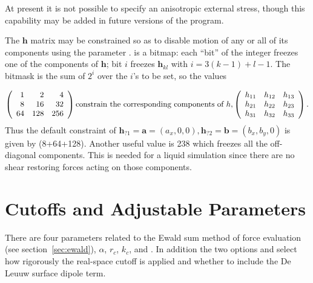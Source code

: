 \documentclass[a4paper,twoside]{report}
\providecommand{\bm}[1]{\mathbf{#1}}
\begin{document}
At present it is not possible to specify an anisotropic external
stress, though this capability may be added in future versions of the
program.

\label{sec:cp-constraints}
The $\bm{h}$ matrix may be constrained so as to disable motion of any
or all of its components using the parameter . 
 is a bitmap: each ``bit'' of the integer
freezes one of the components of $\bm{h}$;
bit $i$ freezes $ \bm{h}_{kl}$ with 
$ i = 3 (k\!-\!1)\! +\! l\! -\!1$.
The bitmask is the sum of $2^i$ over the $i$'s to be set, so the
 values

\begin{displaymath}
\left (
\begin{array}{rrr}
1 & 2 & 4 \\ 8 & 16 & 32 \\ 64 & 128 & 256
\end{array}
\right )
\textnormal{constrain the corresponding components of }
h, 
\left (
\begin{array}{rrr}
h_{11} & h_{12} & h_{13} \\ h_{21} & h_{22} & h_{23} \\ h_{31} & h_{32} & h_{33}
\end{array}
\right ).
\end{displaymath}
\noindent
Thus the default constraint of $\bm{h}_{?1} = \bm{a} = (a_x,0,0),
\bm{h}_{?2} = \bm{b} = (b_x,b_y,0)$ is given by 
\linebreak[2]
(8+64+128).  Another useful value is 238 which freezes all the
off-diagonal components.  This is needed for a liquid simulation since
there are no shear restoring forces acting on those components.

\section{Cutoffs and Adjustable Parameters}%

There are four parameters related to the Ewald sum method of force
evaluation (see section~\ref{sec:ewald}), $\alpha$, $r_c$, $k_c$, and
.  In addition the two options 
and  select how rigorously the real-space
cutoff is applied and whether to include the De Leuuw surface dipole
term.
\end{document}

